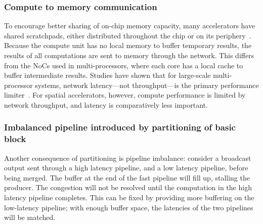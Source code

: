 \subsubsection{Compute to memory communication}
To encourage better sharing of on-chip memory capacity, many accelerators have shared scratchpads, either distributed throughout the chip or on its periphery~\cite{plasticine, brainwave, streamdataflow}.
Because the compute unit has no local memory to buffer temporary results, the results of all computations are sent to memory through the network.
This differs from the NoCs used in multi-processors, where each core has a local cache to buffer intermediate results.
Studies have shown that for large-scale multi-processor systems, network latency---not throughput---is the primary performance limiter~\cite{noc}.
For spatial accelerators, however, compute performance is limited by network throughput, and latency is comparatively less important.

\subsubsection{Imbalanced pipeline introduced by partitioning of basic block}
Another consequence of partitioning is pipeline imbalance: consider a broadcast output sent through a high latency pipeline, and a low latency pipeline, before being merged.
The buffer at the end of the fast pipeline will fill up, stalling the producer.
The congestion will not be resolved until the computation in the high latency pipeline completes.
This can be fixed by providing more buffering on the low-latency pipeline; with enough buffer space, the latencies of the two pipelines will be matched.
\fi


